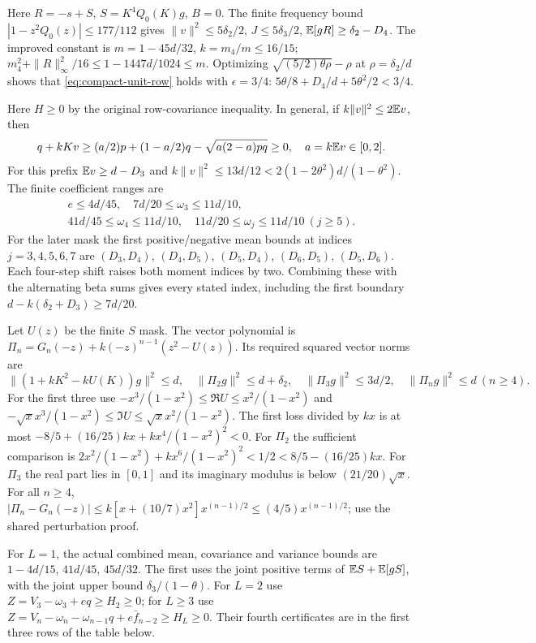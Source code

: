Here $R=-s+S$, $S=K^4Q_0(K)g$, $B=0$.
The finite frequency bound
$|1-z^2Q_0(z)|\le177/112$ gives
$\|v\|^2\le5\delta_{2}/2$, $J\le5\delta_{3}/2$,
$\mathbb E[gR]\ge \delta_{2}-D_4$.
The improved constant is $m=1-45d/32$, $k=m_4/m\le16/15$;
$m_4^2+\|R\|_\infty^2/16\le1-1447d/1024\le m$.
Optimizing $\sqrt{(5/2)\theta\rho}-\rho$ at $\rho=\delta_{2}/d$ shows
that \eqref{eq:compact-unit-row} holds with $\epsilon=3/4$:
$5\theta/8+D_4/d+5\theta^2/2<3/4$.

Here $H\ge0$ by the original row-covariance inequality.
In general, if $k\|v\|^2\le2\mathbb E v$, then
\[
 q+kKv\ge(a/2)p+(1-a/2)q-\sqrt{a(2-a)pq}\ge0,
 \quad a=k\mathbb E v\in[0,2].
\]
For this prefix $\mathbb E v\ge d-D_3$ and
$k\|v\|^2\le13d/12<2(1-2\theta^2)d/(1-\theta^2)$.
The finite coefficient ranges are
\[
\begin{gathered}
 e\le4d/45,\quad
 7d/20\le\omega_3\le11d/10,\\
 41d/45\le\omega_4\le11d/10,\quad
 11d/20\le\omega_j\le11d/10\ (j\ge5).
\end{gathered}
\]
For the later mask the first positive/negative mean bounds at indices
$j=3,4,5,6,7$ are $(D_3,D_4)$, $(D_4,D_5)$,
$(D_5,D_4)$, $(D_6,D_5)$, $(D_5,D_6)$.
Each four-step shift raises both moment indices by two.
Combining these with the alternating beta sums gives every stated index,
including the first boundary $d-k(\delta_{2}+D_3)\ge7d/20$.

Let $U(z)$ be the finite $S$ mask. The vector polynomial is
$\Pi_n=G_n(-z)+k(-z)^{n-1}(z^2-U(z))$.
Its required squared vector norms are
\[
 \|(1+kK^2-kU(K))g\|^2\le d,\quad
 \|\Pi_2g\|^2\le d+\delta_{2},\quad
 \|\Pi_3g\|^2\le3d/2,\quad\|\Pi_ng\|^2\le d\ (n\ge4).
\]
For the first three use
$-x^3/(1-x^2)\le\Re U\le x^2/(1-x^2)$ and
$-\sqrt x x^3/(1-x^2)\le\Im U\le\sqrt x x^2/(1-x^2)$.
The first loss divided by $kx$ is at most
$-8/5+(16/25)kx+kx^4/(1-x^2)^2<0$.
For $\Pi_2$ the sufficient comparison is
$2x^2/(1-x^2)+kx^6/(1-x^2)^2<1/2<8/5-(16/25)kx$.
For $\Pi_3$ the real part lies in $[0,1]$ and its imaginary modulus
is below $(21/20)\sqrt x$.
For all $n\ge4$,
$|\Pi_n-G_n(-z)|\le k[x+(10/7)x^2]x^{(n-1)/2}
\le(4/5)x^{(n-1)/2}$; use the shared perturbation proof.

For $L=1$, the actual combined mean, covariance and variance bounds are
$1-4d/15$, $41d/45$, $45d/32$.
The first uses the joint positive terms of $\mathbb E S+\mathbb E[gS]$,
with the joint upper bound $\delta_{3}/(1-\theta)$.
For $L=2$ use $Z=V_3-\omega_3+eq\ge H_2\ge0$;
for $L\ge3$ use
$Z=V_n-\omega_n-\omega_{n-1}q+e\bar f_{n-2}\ge H_L\ge0$.
Their fourth certificates are in the first three rows of the table below.

